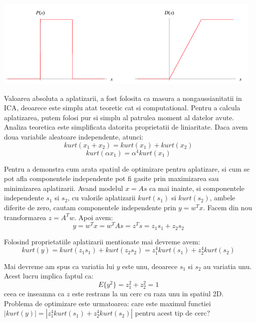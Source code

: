 \documentclass[12pt]{article}
\begin{document}
\begin{center}
	\includegraphics[scale=0.8]{uniform_distribution}
 \end{center}

Valoarea absoluta a aplatizarii, a fost folosita ca masura a nongaussianitatii in ICA, deoarece este simplu atat teoretic cat si computational. Pentru a calcula aplatizarea, putem folosi pur si simplu al patrulea moment al datelor avute. Analiza teoretica este simplificata datorita proprietatii de liniaritate. Daca avem doua variabile aleatoare independente, atunci:
\begin{equation}
kurt(x_1+x_2)=kurt(x_1)	+ kurt(x_2)
\end{equation}
\begin{equation}
kurt(\alpha x_1)=\alpha^4kurt(x_1)
\end{equation}

Pentru a demonstra cum arata spatiul de optimizare pentru aplatizare, si cum se pot afla componentele independente pot fi gasite prin maximizarea sau minimizarea aplatizarii. Avand modelul $x=As$ ca mai inainte, si componentele independente $s_1$ si $s_2$, cu valorile aplatizarii $kurt(s_1)$ si $kurt(s_2)$, ambele diferite de zero, cautam componentele independente prin $y=w^Tx$.
Facem din nou transformarea $z=A^Tw$. Apoi avem:
\begin{equation}
y=w^Tx=w^TAs=z^Ts=z_1s_1+z_2s_2
\end{equation}

Folosind proprietatiile aplatizarii mentionate mai devreme avem:
\begin{equation}
kurt(y)=kurt(z_1s_1)+kurt(z_2s_2)=z_1^4kurt(s_1)+z_2^4kurt(s_2)	
\end{equation}

Mai devreme am spus ca variatia lui $y$ este unu, deoarece $s_1$ si $s_2$ au variatia unu. Acest lucru implica faptul ca:
\begin{equation}
E\{y^2\}=z_1^2+z_2^2=1
\end{equation} 
ceea ce inseamna ca $z$ este restrans la un cerc cu raza unu in spatiul 2D. Problema de optimizare este urmatoarea: care este maximul functiei $|kurt(y)|=|z_1^4kurt(s_1)+z_2^4kurt(s_2)|$ pentru acest tip de cerc?
\end{document}
